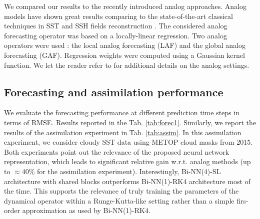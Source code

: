 \documentclass{article}
\begin{document}

We compared our results to the recently introduced analog approaches. Analog models have shown great results comparing to the state-of-the-art classical techniques in SST and SSH fields reconstruction \cite{lguensat_data-driven_2017,fablet_data-driven_2017}. The considered analog forecasting operator was based on a locally-linear regression. Two analog operators were used : the local analog forecasting (LAF) and the global analog forecasting (GAF). Regression weights were computed using a Gaussian kernel function. We let the reader refer to \cite{lguensat_data-driven_2017,fablet_data-driven_2017} for additional details on the analog settings.

\subsection{Forecasting and assimilation performance}
We evaluate the forecasting performance at different prediction time steps in terms of RMSE. Results reported in the Tab. \ref{tab:forec1}. Similarly, we report the results of the assimilation experiment in Tab. \ref{tab:assim}. In this assimilation experiment, we consider cloudy SST data using METOP cloud masks from 2015. Both experiments point out the relevance of the proposed neural network representation, which leads to significant relative gain w.r.t. analog methods (up to $\approx$40\% for the assimilation experiment). Interestingly, Bi-NN(4)-SL architecture with shared blocks outperforms Bi-NN(1)-RK4 architecture most of the time. This supports the relevance of truly training the parameters of the dynamical operator within a Runge-Kutta-like setting rather than a simple firs-order approximation as used by Bi-NN(1)-RK4.
 
 
 
 
\end{document}
